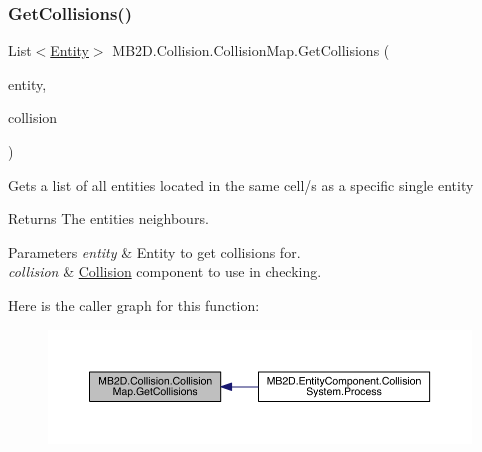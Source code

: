 \subsubsection{\texorpdfstring{Get\+Collisions()}{GetCollisions()}}
{\footnotesize\ttfamily List$<$\hyperlink{class_m_b2_d_1_1_entity_component_1_1_entity}{Entity}$>$ M\+B2\+D.\+Collision.\+Collision\+Map.\+Get\+Collisions (\begin{DoxyParamCaption}\item[{\hyperlink{class_m_b2_d_1_1_entity_component_1_1_entity}{Entity}}]{entity,  }\item[{\hyperlink{class_m_b2_d_1_1_entity_component_1_1_collision_component}{Collision\+Component}}]{collision }\end{DoxyParamCaption})\hspace{0.3cm}{\ttfamily [inline]}}



Gets a list of all entities located in the same cell/s as a specific single entity 

\begin{DoxyReturn}{Returns}
The entities neighbours.
\end{DoxyReturn}

\begin{DoxyParams}{Parameters}
{\em entity} & Entity to get collisions for.\\
\hline
{\em collision} & \hyperlink{namespace_m_b2_d_1_1_collision}{Collision} component to use in checking.\\
\hline
\end{DoxyParams}
Here is the caller graph for this function\+:
\nopagebreak
\begin{figure}[H]
\begin{center}
\leavevmode
\includegraphics[width=350pt]{class_m_b2_d_1_1_collision_1_1_collision_map_acbc6d9d9bb85342cf8f07c22f6947b27_icgraph}
\end{center}
\end{figure}
\hypertarget{class_m_b2_d_1_1_collision_1_1_collision_map_adb3b318fb729bd02cda21a450e504465}{}\label{class_m_b2_d_1_1_collision_1_1_collision_map_adb3b318fb729bd02cda21a450e504465} 

